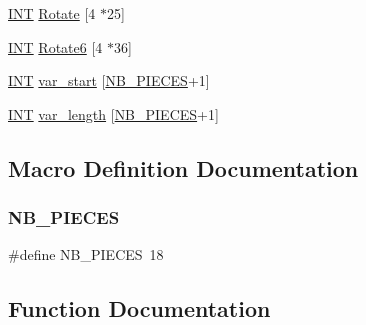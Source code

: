 \begin{DoxyCompactItemize}
\item 
\mbox{\hyperlink{galois_8h_a09fddde158a3a20bd2dcadb609de11dc}{I\+NT}} \mbox{\hyperlink{pentomino__5x5_8_c_a4bc1213c52d2620fde5540bbe810055e}{Rotate}} \mbox{[}4 $\ast$25\mbox{]}
\item 
\mbox{\hyperlink{galois_8h_a09fddde158a3a20bd2dcadb609de11dc}{I\+NT}} \mbox{\hyperlink{pentomino__5x5_8_c_ac7de42eca9a03a7e332a6482dd6f42f6}{Rotate6}} \mbox{[}4 $\ast$36\mbox{]}
\item 
\mbox{\hyperlink{galois_8h_a09fddde158a3a20bd2dcadb609de11dc}{I\+NT}} \mbox{\hyperlink{pentomino__5x5_8_c_a65e4a2ac86ecfce22363c5e87597c33d}{var\+\_\+start}} \mbox{[}\mbox{\hyperlink{pentomino__5x5_8_c_a6af429f2b2d334f82c91c852413498f2}{N\+B\+\_\+\+P\+I\+E\+C\+ES}}+1\mbox{]}
\item 
\mbox{\hyperlink{galois_8h_a09fddde158a3a20bd2dcadb609de11dc}{I\+NT}} \mbox{\hyperlink{pentomino__5x5_8_c_a1a163cb7a16d059aac3f7f1276a2c73a}{var\+\_\+length}} \mbox{[}\mbox{\hyperlink{pentomino__5x5_8_c_a6af429f2b2d334f82c91c852413498f2}{N\+B\+\_\+\+P\+I\+E\+C\+ES}}+1\mbox{]}
\end{DoxyCompactItemize}


\subsection{Macro Definition Documentation}
\mbox{\label{pentomino__5x5_8_c_a6af429f2b2d334f82c91c852413498f2}} 
\subsubsection{\texorpdfstring{N\+B\+\_\+\+P\+I\+E\+C\+ES}{NB\_PIECES}}
{\footnotesize\ttfamily \#define N\+B\+\_\+\+P\+I\+E\+C\+ES~18}



\subsection{Function Documentation}
\mbox{\label{pentomino__5x5_8_c_a293eec075ab3ef8bd6165286db65f948}} 
